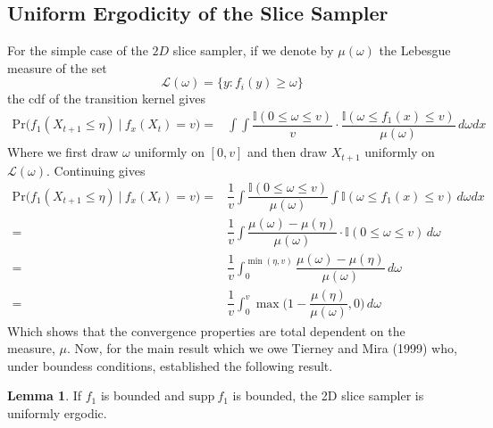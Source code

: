 \documentclass[11pt, a4paper]{article}
\theoremstyle{plain}
\theoremstyle{definition}
\newtheorem{lem}[thm]{Lemma}
\newcommand{\pr}{\mathrm{Pr}}
\begin{document}
\subsection{Uniform Ergodicity of the Slice Sampler}
For the simple case of the $2D$ slice sampler, if we denote
by $\mu(\omega)$ the Lebesgue measure of the set
$$\mathcal{L}(\omega) = \{y : f_i(y) \ge \omega\}$$
the cdf of the transition kernel gives
\begin{align*}
\pr\bigg(f_1(X_{t+1} \le \eta)~|~f_x(X_t) = v\bigg) ={}& \int\int \dfrac{\mathbb{I}(0 \le \omega \le v)}{v}\cdot
\dfrac{\mathbb{I}(\omega \le f_1(x) \le v)}{\mu(\omega)}\,d\omega dx
\end{align*}
Where we first draw $\omega$ uniformly on $[0, v]$ and then draw $X_{t+1}$
uniformly on $\mathcal{L}(\omega)$. Continuing gives
\begin{align*}
\pr\bigg(f_1(X_{t+1} \le \eta)~|~f_x(X_t) = v\bigg) ={}& \dfrac{1}{v}\int\dfrac{\mathbb{I}(0 \le \omega \le v)}{\mu(\omega)}\int \mathbb{I}(\omega \le f_1(x) \le v)\,d\omega dx\\
={}& \dfrac{1}{v}\int
\dfrac{\mu(\omega) - \mu(\eta)}{\mu(\omega)}\cdot\mathbb{I}(0 \le \omega \le v)\,d\omega\\
={}&\dfrac{1}{v}\int_0^{\min(\eta, v)}
\dfrac{\mu(\omega) - \mu(\eta)}{\mu(\omega)}\,d\omega\\
={}&\dfrac{1}{v}\int_0^v
\max\bigg(1 -\dfrac{\mu(\eta)}{\mu(\omega)}, 0\bigg)\,d\omega
\end{align*}
Which shows that the convergence properties are total dependent on the measure, $\mu$.
Now, for the main result which we owe Tierney and Mira (1999) who, under
boundess conditions, established the following result.
\begin{lem}
If $f_1$ is bounded and $\mbox{supp}~f_1$ is bounded, the 2D slice sampler
is uniformly ergodic.
\end{lem}
\end{document}
